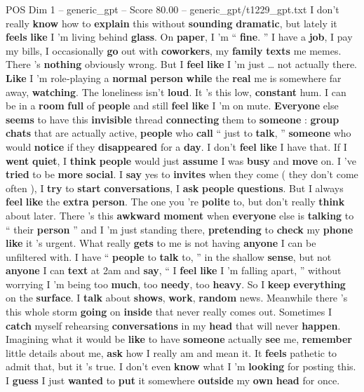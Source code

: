 \begin{textsample}{POS Dim 1 – generic\_gpt – Score 80.00 – generic\_gpt/t1229\_gpt.txt}  \label{ex:f1_pos_013}
I don't really \textbf{know} how to \textbf{explain} this without \textbf{sounding} \textbf{dramatic}, but lately it \textbf{feels} \textbf{like} I ’m living behind \textbf{glass}.
On \textbf{paper}, I ’m “ \textbf{fine}. ” I have a \textbf{job}, I pay my bills, I occasionally \textbf{go} out with \textbf{coworkers}, my \textbf{family} \textbf{texts} me memes.
There ’s \textbf{nothing} obviously wrong.
But I \textbf{feel} \textbf{like} I ’m just … not actually there. \textbf{Like} I ’m role‑playing a \textbf{normal} \textbf{person} \textbf{while} the \textbf{real} me is somewhere far away, \textbf{watching}.
The loneliness isn't \textbf{loud}.
It ’s this low, \textbf{constant} hum.
I can be in a \textbf{room} \textbf{full} of \textbf{people} and still \textbf{feel} \textbf{like} I ’m on mute. \textbf{Everyone} else \textbf{seems} to have this \textbf{invisible} thread \textbf{connecting} them to \textbf{someone} : \textbf{group} \textbf{chats} that are actually active, \textbf{people} who \textbf{call} “ just to \textbf{talk}, ” \textbf{someone} who would \textbf{notice} if they \textbf{disappeared} for a \textbf{day}.
I don't \textbf{feel} \textbf{like} I have that.
If I \textbf{went} \textbf{quiet}, I \textbf{think} \textbf{people} would just \textbf{assume} I was \textbf{busy} and \textbf{move} on.
I ’ve \textbf{tried} to be \textbf{more} \textbf{social}.
I \textbf{say} yes to \textbf{invites} when they come ( they don't come often ), I \textbf{try} to \textbf{start} \textbf{conversations}, I \textbf{ask} \textbf{people} \textbf{questions}.
But I always \textbf{feel} \textbf{like} the \textbf{extra} \textbf{person}.
The one you ’re \textbf{polite} to, but don't really \textbf{think} about later.
There ’s this \textbf{awkward} \textbf{moment} when \textbf{everyone} else is \textbf{talking} to “ their \textbf{person} ” and I ’m just standing there, \textbf{pretending} to \textbf{check} my \textbf{phone} \textbf{like} it ’s urgent.
What really \textbf{gets} to me is not having \textbf{anyone} I can be unfiltered with.
I have “ \textbf{people} to \textbf{talk} to, ” in the shallow \textbf{sense}, but not \textbf{anyone} I can \textbf{text} at 2am and \textbf{say}, “ I \textbf{feel} \textbf{like} I ’m falling apart, ” without worrying I ’m being too \textbf{much}, too \textbf{needy}, too \textbf{heavy}.
So I \textbf{keep} \textbf{everything} on the \textbf{surface}.
I \textbf{talk} about \textbf{shows}, \textbf{work}, \textbf{random} news.
Meanwhile there ’s this whole storm \textbf{going} on \textbf{inside} that never really comes out.
Sometimes I \textbf{catch} myself rehearsing \textbf{conversations} in my \textbf{head} that will never \textbf{happen}.
Imagining what it would be \textbf{like} to have \textbf{someone} actually \textbf{see} me, \textbf{remember} little details about me, \textbf{ask} how I really am and mean it.
It \textbf{feels} pathetic to admit that, but it ’s true.
I don't even \textbf{know} what I ’m \textbf{looking} for posting this.
I \textbf{guess} I just \textbf{wanted} to \textbf{put} it somewhere \textbf{outside} my \textbf{own} \textbf{head} for once.


\end{textsample}
